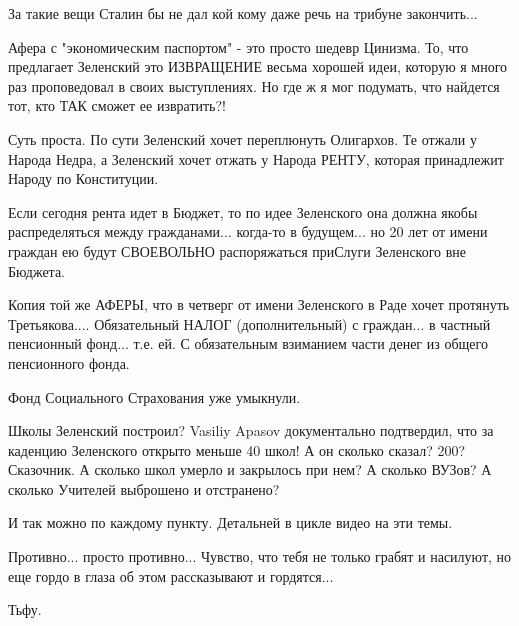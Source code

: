 За такие вещи Сталин бы не дал кой кому даже речь на трибуне закончить...

Афера с "экономическим паспортом" - это просто шедевр Цинизма. То, что
предлагает Зеленский это ИЗВРАЩЕНИЕ весьма хорошей идеи, которую я много раз
проповедовал в своих выступлениях. Но где ж я мог подумать, что найдется тот,
кто ТАК сможет ее извратить?!

Суть проста. По сути Зеленский хочет переплюнуть Олигархов. Те отжали у Народа
Недра, а Зеленский хочет отжать у Народа РЕНТУ, которая принадлежит Народу по
Конституции. 

Если сегодня рента идет в Бюджет, то по идее Зеленского она должна якобы
распределяться между гражданами... когда-то в будущем... но 20 лет от имени
граждан ею будут СВОЕВОЛЬНО распоряжаться приСлуги Зеленского вне Бюджета.

Копия той же АФЕРЫ, что в четверг от имени Зеленского в Раде хочет протянуть
Третьякова.... Обязательный НАЛОГ (дополнительный) с граждан... в частный
пенсионный фонд... т.е. ей. С обязательным взиманием части денег из общего
пенсионного фонда.

Фонд Социального Страхования уже умыкнули.

Школы Зеленский построил? Vasiliy Apasov документально подтвердил, что за
каденцию Зеленского открыто меньше 40 школ! А он сколько сказал? 200?
Сказочник. А сколько школ умерло и закрылось при нем? А сколько ВУЗов? А
сколько Учителей выброшено и отстранено?

И так можно по каждому пункту. Детальней в цикле видео на эти темы. 

Противно... просто противно... Чувство, что тебя не только грабят и насилуют,
но еще гордо в глаза об этом рассказывают и гордятся... 

Тьфу.

